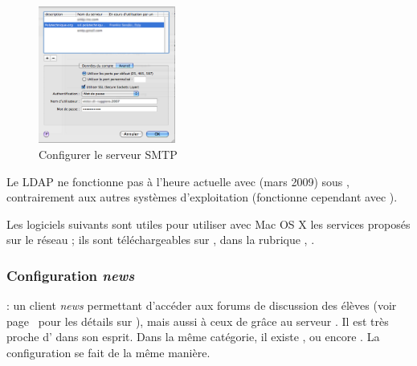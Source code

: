 \begin{figure}[!hl]
    \begin{center}
	      \includegraphics[width=0.4\textwidth]{images/mac_config_smtp_poltechnique.png} 
      \caption{Configurer le serveur SMTP }
    \end{center}
  \end{figure}



Le LDAP ne fonctionne pas à l'heure actuelle avec  (mars 2009) sous , contrairement aux  autres systèmes d'exploitation (fonctionne cependant avec ).



Les logiciels suivants sont utiles pour utiliser avec Mac OS X les services proposés sur le réseau ; ils sont téléchargeables sur , dans la rubrique , .

\pagebreak

\subsubsection{Configuration \emph{news}}

 : un client \emph{news} permettant d'accéder aux forums de discussion des élèves (voir page~\pageref{newsgroups} pour les détails sur ), mais aussi à ceux de  grâce au serveur . Il est très proche d' dans son esprit. Dans la même catégorie, il existe ,  ou encore . La configuration se fait de la même manière.

